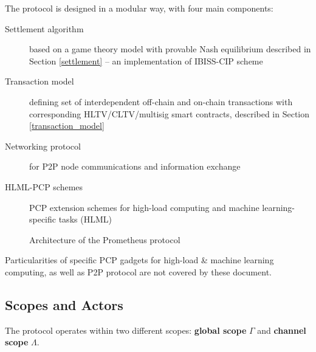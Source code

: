 \documentclass[a4paper]{article}
\begin{document}
The protocol is designed in a modular way, with four main components:
\begin{description}
    \item[Settlement algorithm] based on a game theory model with provable Nash equilibrium described in Section \ref{settlement} – an implementation of IBISS-CIP scheme \cite{ibiss}
    \item[Transaction model] defining set of interdependent off-chain and on-chain transactions with corresponding HLTV/CLTV/multisig smart contracts, described in Section \ref{transaction_model}
    \item[Networking protocol] for P2P node communications and information exchange
    \item[HLML-PCP schemes] PCP extension schemes for high-load computing and machine learning-specific tasks (HLML)
\end{description}

\begin{figure}[h!]
    \centering
    \begin{adjustbox}{center}\end{adjustbox}
    \caption{Architecture of the Prometheus protocol}
    \label{fig:architecture}
\end{figure}

Particularities of specific PCP gadgets for high-load \& machine learning computing, as well as P2P protocol are not covered by these document.

\subsection{Scopes and Actors}
\label{scopes_actors}

The protocol operates within two different scopes: \textbf{global scope} $\Gamma$ and \textbf{channel scope} $\Lambda$.
\end{document}
